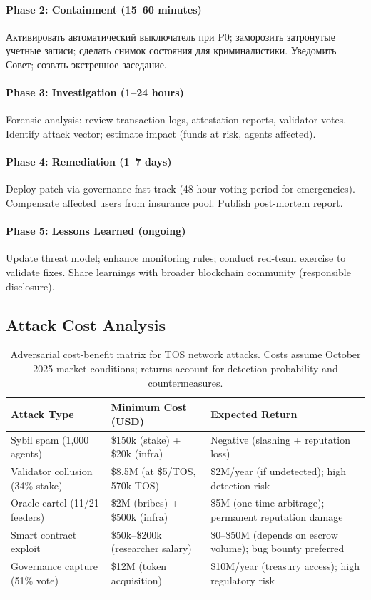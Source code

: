 \documentclass[11pt]{article}
\begin{document}
\paragraph{Phase 2: Containment (15--60 minutes)}
Активировать автоматический выключатель при P0; заморозить затронутые учетные записи; сделать снимок состояния для криминалистики. Уведомить Совет; созвать экстренное заседание.

\paragraph{Phase 3: Investigation (1--24 hours)}
Forensic analysis: review transaction logs, attestation reports, validator votes. Identify attack vector; estimate impact (funds at risk, agents affected).

\paragraph{Phase 4: Remediation (1--7 days)}
Deploy patch via governance fast-track (48-hour voting period for emergencies). Compensate affected users from insurance pool. Publish post-mortem report.

\paragraph{Phase 5: Lessons Learned (ongoing)}
Update threat model; enhance monitoring rules; conduct red-team exercise to validate fixes. Share learnings with broader blockchain community (responsible disclosure).

\subsection{Attack Cost Analysis}

\begin{longtable}{@{}p{}p{}p{}@{}}
\toprule
\textbf{Attack Type} & \textbf{Minimum Cost (USD)} & \textbf{Expected Return} \\\midrule
Sybil spam (1,000 agents) & \$150k (stake) + \$20k (infra) & Negative (slashing + reputation loss) \\
Validator collusion (34\% stake) & \$8.5M (at \$5/TOS, 570k TOS) & \$2M/year (if undetected); high detection risk \\
Oracle cartel (11/21 feeders) & \$2M (bribes) + \$500k (infra) & \$5M (one-time arbitrage); permanent reputation damage \\
Smart contract exploit & \$50k--\$200k (researcher salary) & \$0--\$50M (depends on escrow volume); bug bounty preferred \\
Governance capture (51\% vote) & \$12M (token acquisition) & \$10M/year (treasury access); high regulatory risk \\
\bottomrule
\caption{Adversarial cost-benefit matrix for TOS network attacks. Costs assume October 2025 market conditions; returns account for detection probability and countermeasures.}
\end{longtable}
\end{document}
